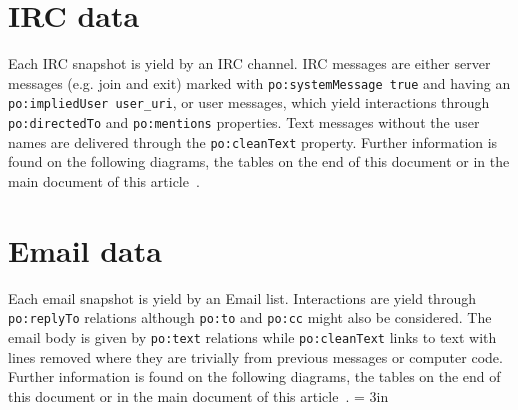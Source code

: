 \documentclass[review]{elsarticle}
\newcommand{\textttt}[1] {\texttt{\footnotesize#1}}
\begin{document}
\section{IRC data}
Each IRC snapshot is yield by an IRC channel.
IRC messages are either server messages (e.g. join and exit)
marked with \textttt{po:systemMessage true} and having an \textttt{po:impliedUser user\_uri},
or user messages, which yield interactions through \textttt{po:directedTo} and \textttt{po:mentions} properties.
Text messages without the user names are delivered through the \textttt{po:cleanText} property.
Further information is found on the following diagrams, the tables on
the end of this document or in the main document of this
article~\cite{losd}.

\section{Email data}
Each email snapshot is yield by an Email list.
Interactions are yield through \textttt{po:replyTo} relations
although \textttt{po:to} and \textttt{po:cc} might also be considered.
The email body is given by \textttt{po:text} relations while
\textttt{po:cleanText} links to text with lines removed where they are
trivially from previous messages or computer code.
Further information is found on the following diagrams, the tables on
the end of this document or in the main document of this
article~\cite{losd}.
\textheight = 3in
\pdfpageheight 6in
\end{document}
